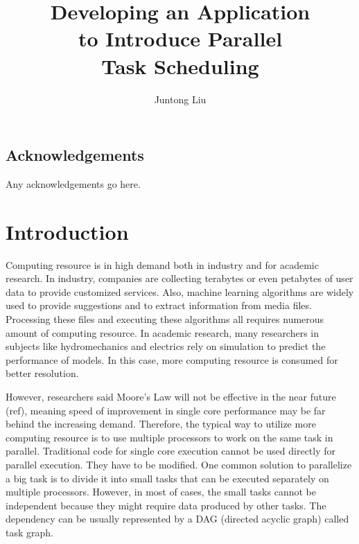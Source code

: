 \documentclass[msc,deptreport, cs]{infthesis}
\begin{document}
\begin{preliminary}

\title{Developing an Application \\to Introduce Parallel \\Task Scheduling}

\author{Juntong Liu}

\abstract{
}

\maketitle

\section*{Acknowledgements}
Any acknowledgements go here. 

\tableofcontents
\end{preliminary}


\chapter{Introduction}

Computing resource is in high demand both in industry and for academic research. In industry, companies are collecting terabytes or even petabytes of user data to provide customized services. Also, machine learning algorithms are widely used to provide suggestions and to extract information from media files. Processing these files and executing these algorithms all requires numerous amount of computing resource. In academic research, many researchers in subjects like hydromechanics and electrics rely on simulation to predict the performance of models. In this case, more computing resource is consumed for better resolution.

However, researchers said Moore's Law will not be effective in the near future (ref), meaning speed of improvement in single core performance may be far behind the increasing demand. Therefore, the typical way to utilize more computing resource is to use multiple processors to work on the same task in parallel. Traditional code for single core execution cannot be used directly for parallel execution. They have to be modified. One common solution to parallelize a big task is to divide it into small tasks that can be executed separately on multiple processors. However, in most of cases, the small tasks cannot be independent because they might require data produced by other tasks. The dependency can be usually represented by a DAG (directed acyclic graph) called task graph.
\end{document}
